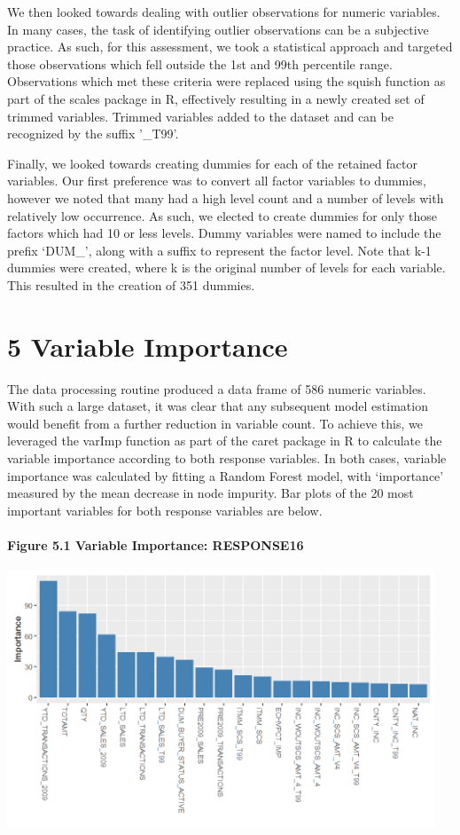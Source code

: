 \documentclass[]{article}
\let\oldparagraph\paragraph
\renewcommand{\paragraph}[1]{\oldparagraph{#1}\mbox{}}
\begin{document}
We then looked towards dealing with outlier observations for numeric
variables. In many cases, the task of identifying outlier observations
can be a subjective practice. As such, for this assessment, we took a
statistical approach and targeted those observations which fell outside
the 1st and 99th percentile range. Observations which met these criteria
were replaced using the squish function as part of the scales package in
R, effectively resulting in a newly created set of trimmed variables.
Trimmed variables added to the dataset and can be recognized by the
suffix '\_T99'.

Finally, we looked towards creating dummies for each of the retained
factor variables. Our first preference was to convert all factor
variables to dummies, however we noted that many had a high level count
and a number of levels with relatively low occurrence. As such, we
elected to create dummies for only those factors which had 10 or less
levels. Dummy variables were named to include the prefix `DUM\_', along
with a suffix to represent the factor level. Note that k-1 dummies were
created, where k is the original number of levels for each variable.
This resulted in the creation of 351 dummies.

\section{5 Variable Importance}\label{variable-importance}

The data processing routine produced a data frame of 586 numeric
variables. With such a large dataset, it was clear that any subsequent
model estimation would benefit from a further reduction in variable
count. To achieve this, we leveraged the varImp function as part of the
caret package in R to calculate the variable importance according to
both response variables. In both cases, variable importance was
calculated by fitting a Random Forest model, with `importance' measured
by the mean decrease in node impurity. Bar plots of the 20 most
important variables for both response variables are below.

\paragraph{Figure 5.1 Variable Importance:
RESPONSE16}\label{figure-5.1-variable-importance-response16}

\includegraphics[height=3.02083in]{images/varimp_response16.png}
\end{document}
